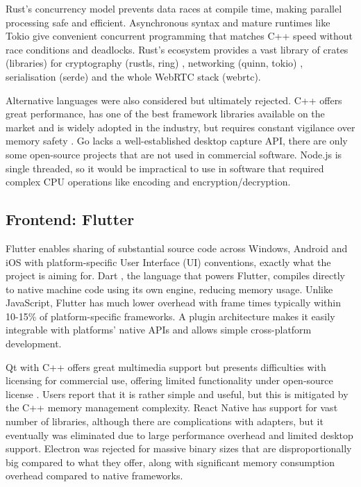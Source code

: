 \documentclass[12pt,a4paper]{article}
\begin{document}
Rust's concurrency model prevents data races at compile time, making parallel processing safe and efficient. Asynchronous syntax and mature runtimes like Tokio \cite{Tok25} give convenient concurrent programming that matches C++ speed without race conditions and deadlocks. Rust's ecosystem provides a vast library of crates (libraries) for cryptography (rustls, ring) \cite{Buch21}, networking (quinn, tokio) \cite{Leap25b}, serialisation (serde) \cite{End24} and the whole WebRTC stack (webrtc).

Alternative languages were also considered but ultimately rejected. C++ offers great performance, has one of the best framework libraries available on the market and is widely adopted in the industry, but requires constant vigilance over memory safety \cite{MS19b}. Go \cite{Golang} lacks a well-established desktop capture API, there are only some open-source projects that are not used in commercial software. Node.js is single threaded, so it would be impractical to use in software that required complex CPU operations like encoding and encryption/decryption.

\subsection{Frontend: Flutter}

Flutter \cite{Flutt} enables sharing of substantial source code across Windows, Android and iOS with platform-specific User Interface (UI) conventions, exactly what the project is aiming for. Dart \cite{TP24}, the language that powers Flutter, compiles directly to native machine code using its own engine, reducing memory usage. Unlike JavaScript, Flutter has much lower overhead with frame times typically within 10-15\% of platform-specific frameworks. A plugin architecture makes it easily integrable with platforms' native APIs and allows simple cross-platform development.

Qt \cite{Qt24} with C++ offers great multimedia support but presents difficulties with licensing for commercial use, offering limited functionality under open-source license \cite{Qt25}. Users report that it is rather simple and useful, but this is mitigated by the C++ memory management complexity. React Native \cite{BR25} has support for vast number of libraries, although there are complications with adapters, but it eventually was eliminated due to large performance overhead and limited desktop support. Electron \cite{FT21} was rejected for massive binary sizes that are disproportionally big compared to what they offer, along with significant memory consumption overhead compared to native frameworks.
\end{document}
